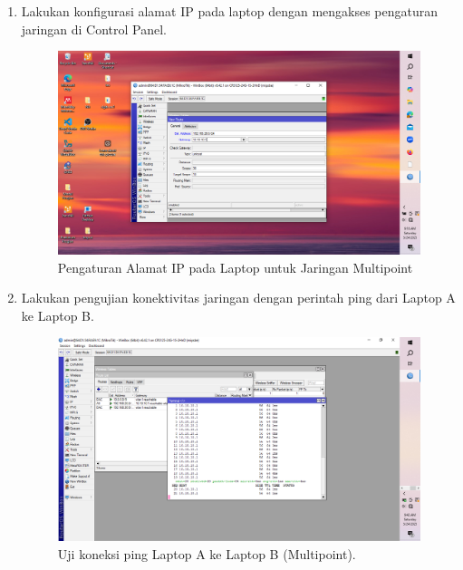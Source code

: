 \begin{enumerate}
    \item Lakukan konfigurasi alamat IP pada laptop dengan mengakses pengaturan jaringan di Control Panel.
    \begin{figure}[H]
        \centering
        \includegraphics[width=0.5\linewidth]{P3/img/gambar5.png}
        \caption{Pengaturan Alamat IP pada Laptop untuk Jaringan Multipoint}
        \label{fig:ip-laptop-multi}
    \end{figure}

    \item Lakukan pengujian konektivitas jaringan dengan perintah ping dari Laptop A ke Laptop B.
    \begin{figure}[H]
        \centering
        \includegraphics[width=0.5\linewidth]{P3/img/ping2.png}
        \caption{Uji koneksi ping Laptop A ke Laptop B (Multipoint).}
        \label{fig:ping-multi}
    \end{figure}
\end{enumerate}

